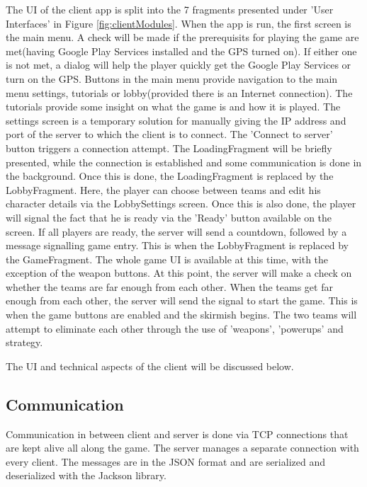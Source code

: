 The UI of the client app is split into the 7 fragments presented under 'User
Interfaces' in Figure \ref{fig:clientModules}. When the app is run, the first
screen is the main menu. A check will be made if the prerequisits for
playing the game are met(having Google Play Services installed and the
GPS turned on). If either one is not met, a dialog will help the player
quickly get the Google Play Services or turn on the GPS. Buttons in the main
menu provide navigation to the main menu settings, tutorials or lobby(provided
there is an Internet connection). The tutorials provide some insight on what the
game is and how it is played. The settings screen is a temporary solution for
manually giving the IP address and port of the server to which the client is to
connect. The 'Connect to server' button triggers a connection attempt. The
LoadingFragment will be briefly presented, while the connection is established
and some communication is done in the background. Once this is done, the
LoadingFragment is replaced by the LobbyFragment. Here, the player can choose
between teams and edit his character details via the LobbySettings screen. Once
this is also done, the player will signal the fact that he is ready via the
'Ready' button available on the screen. If all players are ready, the server
will send a countdown, followed by a message signalling game entry. This is when
the LobbyFragment is replaced by the GameFragment. The whole game UI is
available at this time, with the exception of the weapon buttons. At this point,
the server will make a check on whether the teams are far enough from each
other. When the teams get far enough from each other, the server will send the
signal to start the game. This is when the game buttons are enabled and the
skirmish begins. The two teams will attempt to eliminate each other through the
use of 'weapons', 'powerups' and strategy.\newline

The UI and technical aspects of the client will be discussed below.\newline


\subsection{Communication}

Communication in between client and server is done via TCP connections that are
kept alive all along the game. The server manages a separate connection with
every client. The messages are in the JSON format and are serialized and
deserialized with the Jackson library.\newline

